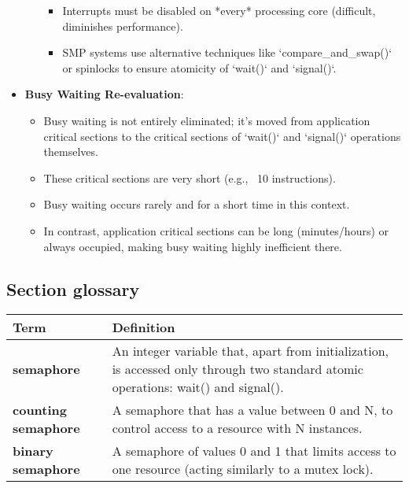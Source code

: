 \begin{itemize}
\begin{itemize}
        \begin{itemize}
            \item Interrupts must be disabled on *every* processing core (difficult, diminishes performance).
            \item SMP systems use alternative techniques like `compare\_and\_swap()` or spinlocks to ensure atomicity of `wait()` and `signal()`.
        \end{itemize}
    \end{itemize}
    \item \textbf{Busy Waiting Re-evaluation}:
    \begin{itemize}
        \item Busy waiting is not entirely eliminated; it's moved from application critical sections to the critical sections of `wait()` and `signal()` operations themselves.
        \item These critical sections are very short (e.g., ~10 instructions).
        \item Busy waiting occurs rarely and for a short time in this context.
        \item In contrast, application critical sections can be long (minutes/hours) or always occupied, making busy waiting highly inefficient there.
    \end{itemize}
\end{itemize}

\subsection*{Section glossary}
\centering
\begin{tabular}{>{\raggedright}p{} >{\raggedright\arraybackslash}p{}}
\toprule
\textbf{Term} & \textbf{Definition} \\
\midrule
\textbf{semaphore} & An integer variable that, apart from initialization, is accessed only through two standard atomic operations: wait() and signal(). \\
\textbf{counting semaphore} & A semaphore that has a value between 0 and N, to control access to a resource with N instances. \\
\textbf{binary semaphore} & A semaphore of values 0 and 1 that limits access to one resource (acting similarly to a mutex lock). \\
\bottomrule
\end{tabular}
\vspace{\baselineskip}
